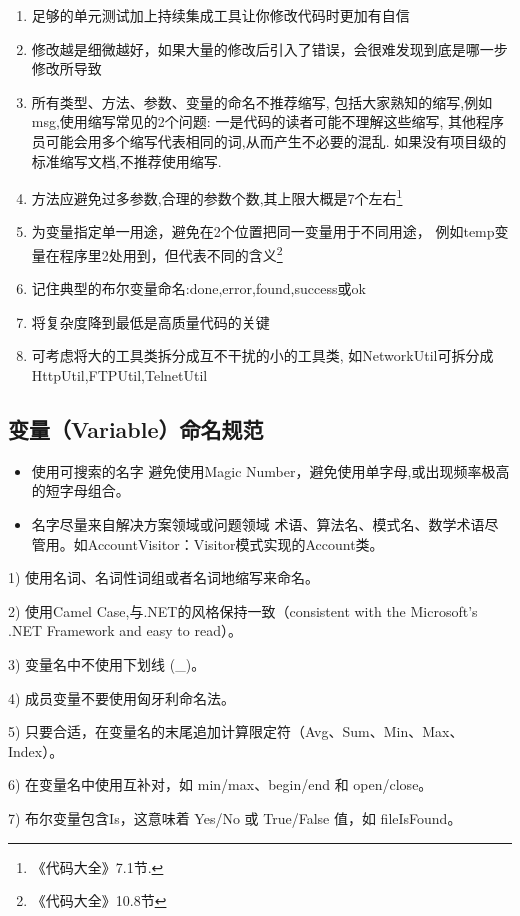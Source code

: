 \documentclass{book}
\begin{document}
\begin{enumerate}
\item{足够的单元测试加上持续集成工具让你修改代码时更加有自信}
\item{修改越是细微越好，如果大量的修改后引入了错误，会很难发现到底是哪一步修改所导致}
\item{所有类型、方法、参数、变量的命名不推荐缩写,
包括大家熟知的缩写,例如 msg,使用缩写常见的2个问题:
一是代码的读者可能不理解这些缩写,
其他程序员可能会用多个缩写代表相同的词,从而产生不必要的混乱.
如果没有项目级的标准缩写文档,不推荐使用缩写.}
\item{方法应避免过多参数,合理的参数个数,其上限大概是7个左右\footnote{《代码大全》7.1节.}}
\item{为变量指定单一用途，避免在2个位置把同一变量用于不同用途，
例如temp变量在程序里2处用到，但代表不同的含义\footnote{《代码大全》10.8节}}
\item{记住典型的布尔变量命名:done,error,found,success或ok}
\item{将复杂度降到最低是高质量代码的关键}
\item{可考虑将大的工具类拆分成互不干扰的小的工具类,
如NetworkUtil可拆分成HttpUtil,FTPUtil,TelnetUtil}
\end{enumerate}	

\subsection{变量（Variable）命名规范}


\begin{itemize}
	\item{使用可搜索的名字} 避免使用Magic Number，避免使用单字母,或出现频率极高的短字母组合。
	\item{名字尽量来自解决方案领域或问题领域} 术语、算法名、模式名、数学术语尽管用。如AccountVisitor：Visitor模式实现的Account类。
\end{itemize}

1)  使用名词、名词性词组或者名词地缩写来命名。

2)  使用Camel Case,与.NET的风格保持一致（consistent with the Microsoft's .NET Framework and easy to read）。

3)  变量名中不使用下划线 (\_)。

4)  成员变量不要使用匈牙利命名法。

5)  只要合适，在变量名的末尾追加计算限定符（Avg、Sum、Min、Max、Index）。

6)  在变量名中使用互补对，如 min/max、begin/end 和 open/close。

7)  布尔变量包含Is，这意味着 Yes/No 或 True/False 值，如 fileIsFound。
\end{document}
